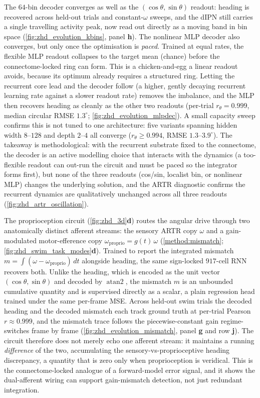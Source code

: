 \documentclass[11pt]{article}
\begin{document}
The $64$-bin decoder converges as well as the $(\cos\theta,\sin\theta)$
readout: heading is recovered across held-out trials and constant-$\omega$
sweeps, and the dIPN still carries a single travelling activity peak, now
read out directly as a moving band in bin space
(\cref{fig:zhd_evolution_kbins}, panel \textbf{h}). The nonlinear MLP
decoder also converges, but only once the optimisation is \emph{paced}.
Trained at equal rates, the flexible MLP readout collapses to the target
mean (chance) before the connectome-locked ring can form. This is a
chicken-and-egg a linear readout avoids, because its optimum already
requires a structured ring. Letting the recurrent core lead and the
decoder follow (a higher, gently decaying recurrent learning rate against a
slower readout rate) removes the imbalance, and the MLP then recovers
heading as cleanly as the other two readouts (per-trial $r_\theta=0.999$,
median circular RMSE $1.3^\circ$; \cref{fig:zhd_evolution_mlpdec}). A small
capacity sweep confirms this is not tuned to one architecture: five
variants spanning hidden width $8$--$128$ and depth $2$--$4$ all converge
($r_\theta\ge0.994$, RMSE $1.3$--$3.9^\circ$). The takeaway is
methodological: with the recurrent substrate fixed to the connectome, the
decoder is an active modelling choice that interacts with the dynamics
(a too-flexible readout can out-run the circuit and must be paced so the
integrator forms first), but none of the three readouts (cos/sin,
localist bin, or nonlinear MLP) changes the underlying solution, and the
ARTR diagnostic confirms the recurrent dynamics are qualitatively unchanged
across all three readouts (\cref{fig:zhd_artr_oscillation}).

\label{sec:results_mismatch}
The proprioception circuit (\cref{fig:zhd_3d}\textbf{d}) routes the
angular drive through two anatomically distinct afferent streams: the
sensory ARTR copy $\omega$ and a gain-modulated motor-efference copy
$\omega_{\mathrm{proprio}}=g(t)\,\omega$
(\cref{method:mismatch}; \cref{fig:zhd_swim_task_modes}\textbf{d}).
Trained to report the integrated mismatch
$m=\int(\omega-\omega_{\mathrm{proprio}})\,dt$ alongside heading, the same
sign-locked $917$-cell RNN recovers both. Unlike the heading, which is
encoded as the unit vector $(\cos\theta,\sin\theta)$ and decoded by
$\operatorname{atan2}$, the mismatch $m$ is an unbounded cumulative
quantity and is supervised directly as a scalar, a plain regression
head trained under the same per-frame MSE. Across held-out swim trials the
decoded heading and the decoded mismatch each track ground truth at
per-trial Pearson $r\approx0.999$, and the mismatch trace follows the
piecewise-constant gain regime-switches frame by frame
(\cref{fig:zhd_evolution_mismatch}, panel \textbf{g} and row \textbf{j}).
The circuit therefore does not merely echo one afferent stream: it
maintains a running \emph{difference} of the two, accumulating the
sensory-vs-proprioceptive heading discrepancy, a quantity that is zero
only when proprioception is veridical. This is the connectome-locked
analogue of a forward-model error signal, and it shows the dual-afferent
wiring can support gain-mismatch detection, not just redundant
integration.
\end{document}
